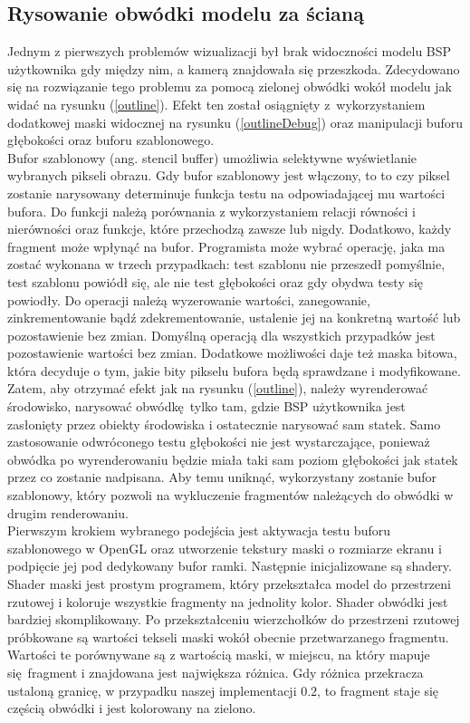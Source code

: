 \subsection{Rysowanie obwódki modelu za ścianą}

Jednym z pierwszych problemów wizualizacji był brak widoczności modelu BSP użytkownika gdy między nim, a kamerą znajdowała się przeszkoda. Zdecydowano się na rozwiązanie tego problemu za pomocą zielonej obwódki wokół modelu jak widać na rysunku (\ref{outline}). Efekt ten został osiągnięty z~wykorzystaniem dodatkowej maski widocznej na rysunku (\ref{outlineDebug}) oraz manipulacji buforu głębokości oraz buforu szablonowego.
\\

Bufor szablonowy (ang. stencil buffer) umożliwia selektywne wyświetlanie wybranych pikseli obrazu. Gdy bufor szablonowy jest włączony, to to czy piksel zostanie narysowany determinuje funkcja testu na odpowiadającej mu wartości bufora. Do funkcji należą porównania z wykorzystaniem relacji równości i nierówności oraz funkcje, które przechodzą zawsze lub nigdy.
Dodatkowo, każdy fragment może wpłynąć na bufor. Programista może wybrać operację, jaka ma zostać wykonana w trzech przypadkach: test szablonu nie przeszedł pomyślnie, test szablonu powiódł się, ale nie test głębokości oraz gdy obydwa testy się powiodły. Do operacji należą wyzerowanie wartości, zanegowanie, zinkrementowanie bądź zdekrementowanie, ustalenie jej na konkretną wartość lub pozostawienie bez zmian. Domyślną operacją dla wszystkich przypadków jest pozostawienie wartości bez zmian. Dodatkowe możliwości daje też maska bitowa, która decyduje o tym, jakie bity pikselu bufora będą sprawdzane i modyfikowane. 
\\

Zatem, aby otrzymać efekt jak na rysunku (\ref{outline}), należy wyrenderować środowisko, narysować obwódkę tylko tam, gdzie BSP użytkownika jest zasłonięty przez obiekty środowiska i ostatecznie narysować sam statek. Samo zastosowanie odwróconego testu głębokości nie jest wystarczające, ponieważ obwódka po wyrenderowaniu będzie miała taki sam poziom głębokości jak statek przez co zostanie nadpisana. Aby temu uniknąć, wykorzystany zostanie bufor szablonowy, który pozwoli na wykluczenie fragmentów należących do obwódki w drugim renderowaniu.
\\

Pierwszym krokiem wybranego podejścia jest aktywacja testu buforu szablonowego w OpenGL oraz utworzenie tekstury maski o rozmiarze ekranu i podpięcie jej pod dedykowany bufor ramki. Następnie inicjalizowane są shadery. Shader maski jest prostym programem, który przekształca model do przestrzeni rzutowej i koloruje wszystkie fragmenty na jednolity kolor. Shader obwódki jest bardziej skomplikowany. Po przekształceniu wierzchołków do przestrzeni rzutowej próbkowane są wartości tekseli maski wokół obecnie przetwarzanego fragmentu. Wartości te porównywane są z wartością maski, w miejscu, na który mapuje się fragment i znajdowana jest największa różnica. Gdy różnica przekracza ustaloną granicę, w przypadku naszej implementacji $0.2$, to fragment staje się częścią obwódki i jest kolorowany na zielono.
\\

